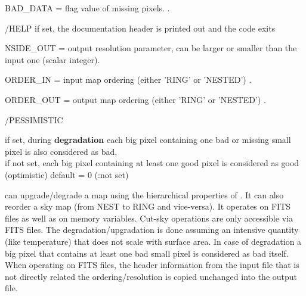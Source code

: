 \begin{keywords}
  \begin{kwlist}{} %
    \item[BAD\_DATA =] %
	flag value of missing pixels.
          .
    \item[/HELP] %
	 if set, the documentation header is printed out and the code exits
    \item[NSIDE\_OUT =] %
	 output resolution parameter, can be
    larger or smaller than the input one (scalar integer).
    \item[ORDER\_IN =] %
	input map ordering (either 'RING' or 'NESTED')
	.
    \item[ORDER\_OUT =] %
	output map ordering (either 'RING' or 'NESTED')
	.
    \item[/PESSIMISTIC] %
	\parbox[t]{0.5\hsize}{if set, during {\bf degradation} each big pixel containing one
    bad or missing small pixel is also considered as bad, \\
        if not set, each big pixel containing at least one good pixel
    is considered as good (optimistic)
       default = 0 (:not set)}
  \end{kwlist}
\end{keywords}  

\begin{codedescription}
{\facname{} can upgrade/degrade a \healpix map using the hierarchical
properties of \healpixns. It can also reorder a sky map (from NEST to RING and
vice-versa). It operates on FITS files as well as on memory variables. Cut-sky
operations are only accessible via FITS files.
The degradation/upgradation is done assuming an
intensive quantity (like temperature) that does not scale with surface area. 
In case of degradation a big pixel that contains at least one bad small pixel is
considered as bad itself. When operating on FITS files, the header information
from the input file that is not directly related the ordering/resolution is
copied unchanged into the output file.}
\end{codedescription}




